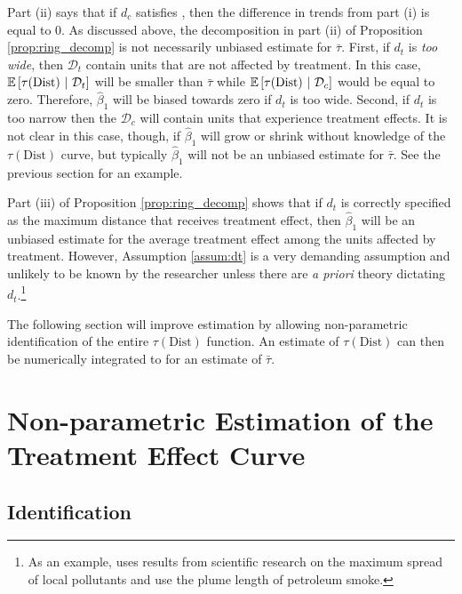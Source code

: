 \documentclass[10pt]{article}
\newcommand{\dist}{\text{Dist}}
\begin{document}
Part (ii) says that if $d_c$ satisfies , then the difference in trends from part (i) is equal to 0. As discussed above, the decomposition in part (ii) of Proposition \ref{prop:ring_decomp} is not necessarily unbiased estimate for $\bar{\tau}$. First, if $d_t$ is \emph{too wide}, then $\mathcal{D}_t$ contain units that are not affected by treatment. In this case, $\condexpec{\tau(\dist)}{\mathcal{D}_t}$ will be smaller than $\bar{\tau}$ while $\condexpec{\tau(\dist)}{\mathcal{D}_c}$ would be equal to zero. Therefore, $\hat{\beta}_1$ will be biased towards zero if $d_t$ is too wide. Second, if $d_t$ is {too narrow} then the $\mathcal{D}_c$ will contain units that experience treatment effects. It is not clear in this case, though, if $\hat{\beta}_1$ will grow or shrink without knowledge of the $\tau(\dist)$ curve, but typically $\hat{\beta}_1$ will not be an unbiased estimate for $\bar{\tau}$. See the previous section for an example. 

Part (iii) of Proposition \ref{prop:ring_decomp} shows that if $d_t$ is correctly specified as the maximum distance that receives treatment effect, then $\hat{\beta}_1$ will be an unbiased estimate for the average treatment effect among the units affected by treatment. However, Assumption \ref{assum:dt} is a very demanding assumption and unlikely to be known by the researcher unless there are \emph{a priori} theory dictating $d_t$.\footnote{As an example, \citet{Currie_Davis_Greenstone_Walker_2015} uses results from scientific research on the maximum spread of local pollutants and \citet{Marcus_2021} use the plume length of petroleum smoke.} 

The following section will improve estimation by allowing non-parametric identification of the entire $\tau(\dist)$ function. An estimate of $\tau(\dist)$ can then be numerically integrated to for an estimate of $\bar{\tau}$.



\section{Non-parametric Estimation of the Treatment Effect Curve}\label{sec:lspartition}

\subsection{Identification}
\end{document}

